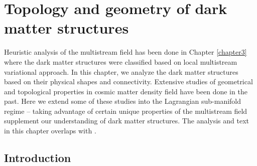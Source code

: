 \chapter{Topology and geometry of dark matter structures}\label{chapter4}

Heuristic analysis of the multistream field has been done in Chapter \ref{chapter3} where the dark matter structures were classified based on local multistream variational approach. In this chapter, we analyze the dark matter structures based on their physical shapes and connectivity. Extensive studies of geometrical and topological properties in cosmic matter density field have been done in the past. Here we extend some of these studies into the Lagrangian sub-manifold regime -- taking advantage of certain unique properties of the multistream field supplement our understanding of dark matter structures. The analysis and text in this chapter overlaps with \cite{Ramachandra2017}.   


\section{Introduction} 
\label{sec:4intro}


